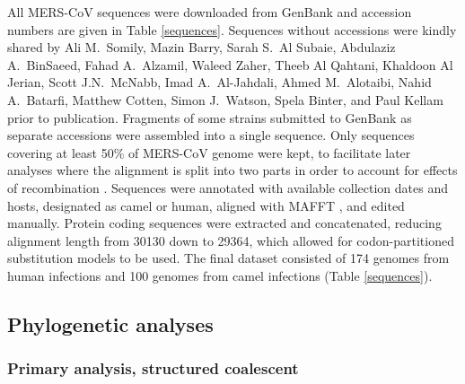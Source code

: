\documentclass[11pt,oneside,letterpaper]{article}
\begin{document}
All MERS-CoV sequences were downloaded from GenBank and accession numbers are given in Table \ref{sequences}.
Sequences without accessions were kindly shared by Ali M.\ Somily, Mazin Barry, Sarah S.\ Al Subaie, Abdulaziz A.\ BinSaeed, Fahad A.\ Alzamil, Waleed Zaher, Theeb Al Qahtani, Khaldoon Al Jerian, Scott J.N.\ McNabb, Imad A.\ Al-Jahdali, Ahmed M.\ Alotaibi, Nahid A.\ Batarfi, Matthew Cotten, Simon J.\ Watson, Spela Binter, and Paul Kellam prior to publication.
Fragments of some strains submitted to GenBank as separate accessions were assembled into a single sequence.
Only sequences covering at least 50\% of MERS-CoV genome were kept, to facilitate later analyses where the alignment is split into two parts in order to account for effects of recombination \citep{dudas_mers-cov_2016}.
Sequences were annotated with available collection dates and hosts, designated as camel or human, aligned with MAFFT \citep{katoh_mafft_2013}, and edited manually.
Protein coding sequences were extracted and concatenated, reducing alignment length from 30130 down to 29364, which allowed for codon-partitioned substitution models to be used.
The final dataset consisted of 174 genomes from human infections and 100 genomes from camel infections (Table \ref{sequences}).

\subsection*{Phylogenetic analyses}

\subsubsection*{Primary analysis, structured coalescent}
\end{document}
